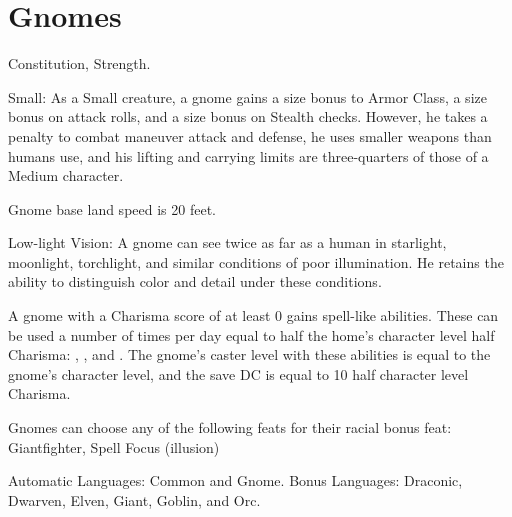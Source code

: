 \section{Gnomes}
\begin{itemize*}
\item {} Constitution,  Strength.
\item Small: As a Small creature, a gnome gains a  size bonus to Armor Class, a  size bonus on attack rolls, and a  size bonus on Stealth checks. However, he takes a  penalty to combat maneuver attack and defense, he uses smaller weapons than humans use, and his lifting and carrying limits are three-quarters of those of a Medium character.
\item Gnome base land speed is 20 feet.
\item Low-light Vision: A gnome can see twice as far as a human in starlight, moonlight, torchlight, and similar conditions of poor illumination. He retains the ability to distinguish color and detail under these conditions.
\item A gnome with a Charisma score of at least 0 gains spell-like abilities. These can be used a number of times per day equal to half the home's character level \add half Charisma:  , , and . The gnome's caster level with these abilities is equal to the gnome's character level, and the save DC is equal to 10 \add half character level \add Charisma.

\item Gnomes can choose any of the following feats for their racial bonus feat: Giantfighter, Spell Focus (illusion)
\item Automatic Languages: Common and Gnome. Bonus Languages: Draconic, Dwarven, Elven, Giant, Goblin, and Orc.
\end{itemize*}

